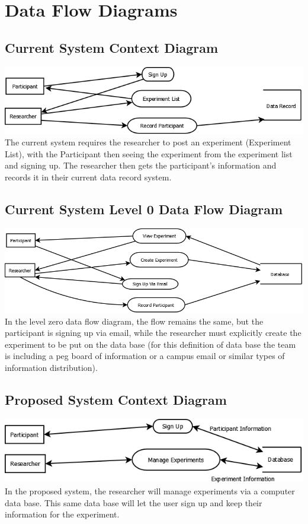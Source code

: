 \section{Data Flow Diagrams}
\subsection{Current System Context Diagram}
\includegraphics[width=6in]{../other/data-flow-diagrams/current_system_context_diagram.png}\\
The current system requires the researcher to post an experiment (Experiment List), with the Participant then seeing the experiment from the experiment list and signing up.  The researcher then gets the participant's information and records it in their current data record system.

\subsection{Current System Level 0 Data Flow Diagram}
\includegraphics[width=6in]{../other/data-flow-diagrams/current_system_level0.png}\\
In the level zero data flow diagram, the flow remains the same, but the participant is signing up via email, while the researcher must explicitly create the experiment to be put on the data base (for this definition of data base the team is including a peg board of information or a campus email or similar types of information distribution).

\subsection{Proposed System Context Diagram}
\includegraphics[width=6in]{../other/data-flow-diagrams/new_system_context.png}\\
In the proposed system, the researcher will manage experiments via a computer data base.  This same data base will let the user sign up and keep their information for the experiment.


